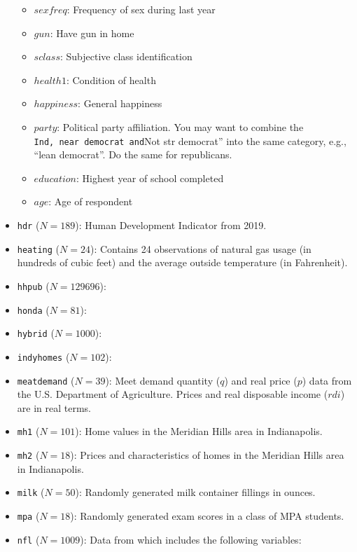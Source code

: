 \documentclass[
]{article}
\providecommand{\tightlist}{%
  \setlength{\itemsep}{0pt}\setlength{\parskip}{0pt}}
\begin{document}
\begin{itemize}
  \begin{itemize}
  \tightlist
  \item
    \(sexfreq\): Frequency of sex during last year
  \item
    \(gun\): Have gun in home
  \item
    \(sclass\): Subjective class identification
  \item
    \(health1\): Condition of health
  \item
    \(happiness\): General happiness
  \item
    \(party\): Political party affiliation. You may want to combine the \texttt{Ind,\ near\ democrat\textquotesingle{}\textquotesingle{}\ and}Not str democrat'' into the same category, e.g., ``lean democrat''. Do the same for republicans.
  \item
    \(education\): Highest year of school completed
  \item
    \(age\): Age of respondent
  \end{itemize}
\item
  \texttt{hdr} (\(N=189\)): Human Development Indicator from 2019.
\item
  \texttt{heating} (\(N=24\)): Contains 24 observations of natural gas usage (in hundreds of cubic feet) and the average outside temperature (in Fahrenheit).
\item
  \texttt{hhpub} (\(N=129696\)):
\item
  \texttt{honda} (\(N=81\)):
\item
  \texttt{hybrid} (\(N=1000\)):
\item
  \texttt{indyhomes} (\(N=102\)):
\item
  \texttt{meatdemand} (\(N=39\)): Meet demand quantity (\(q\)) and real price (\(p\)) data from the U.S. Department of Agriculture. Prices and real disposable income (\(rdi\)) are in real terms.
\item
  \texttt{mh1} (\(N=101\)): Home values in the Meridian Hills area in Indianapolis.
\item
  \texttt{mh2} (\(N=18\)): Prices and characteristics of homes in the Meridian Hills area in Indianapolis.
\item
  \texttt{milk} (\(N=50\)): Randomly generated milk container fillings in ounces.
\item
  \texttt{mpa} (\(N=18\)): Randomly generated exam scores in a class of MPA students.
\item
  \texttt{nfl} (\(N=1009\)): Data from \citet{Berri:2011} which includes the following variables:


\end{itemize}
\end{document}
